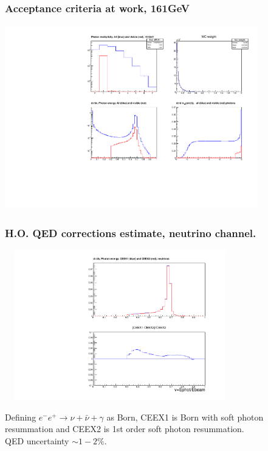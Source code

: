 \documentclass{beamer}
\newcommand{\crd}{\color{red}}
\begin{document}
\begin{frame}[fragile]
\frametitle{\bf Acceptance criteria at work, 161GeV}

\vspace{-2mm}
{\includegraphics[width=110mm,height=80mm]{mcFigInfo.pdf}}

\end{frame}


\begin{frame}[fragile]
\frametitle{\bf H.O. QED corrections estimate, neutrino channel.}

\vspace{-2mm}
{\includegraphics[width=100mm,height=65mm]{mcCeex21.pdf}}

\small
Defining $e^-e^+\to\nu+\bar\nu+\gamma$ as Born, 
CEEX1 is Born with soft photon resummation 
and CEEX2 is 1st order soft photon resummation.\\
{\crd QED uncertainty $\sim 1-2\%$.}

\end{frame}
\end{document}
